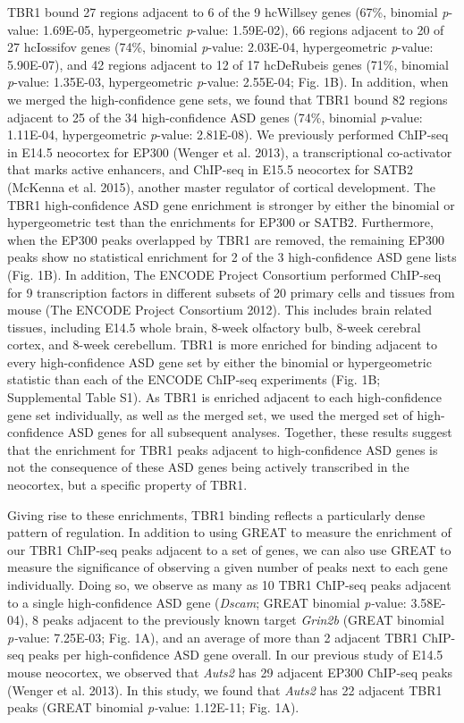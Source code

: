 \documentclass[]{article}
\begin{document}
TBR1 bound 27 regions adjacent to 6 of the 9 hcWillsey genes (67\%,
binomial \emph{p}-value: 1.69E-05, hypergeometric \emph{p}-value:
1.59E-02), 66 regions adjacent to 20 of 27 hcIossifov genes (74\%,
binomial \emph{p}-value: 2.03E-04, hypergeometric \emph{p}-value:
5.90E-07), and 42 regions adjacent to 12 of 17 hcDeRubeis genes (71\%,
binomial \emph{p}-value: 1.35E-03, hypergeometric \emph{p}-value:
2.55E-04; Fig. 1B). In addition, when we merged the high-confidence gene
sets, we found that TBR1 bound 82 regions adjacent to 25 of the 34
high-confidence ASD genes (74\%, binomial \emph{p}-value: 1.11E-04,
hypergeometric \emph{p}-value: 2.81E-08). We previously performed
ChIP-seq in E14.5 neocortex for EP300 (Wenger et al. 2013), a
transcriptional co-activator that marks active enhancers, and ChIP-seq
in E15.5 neocortex for SATB2 (McKenna et al. 2015), another master
regulator of cortical development. The TBR1 high-confidence ASD gene
enrichment is stronger by either the binomial or hypergeometric test
than the enrichments for EP300 or SATB2. Furthermore, when the EP300
peaks overlapped by TBR1 are removed, the remaining EP300 peaks show no
statistical enrichment for 2 of the 3 high-confidence ASD gene lists
(Fig. 1B). In addition, The ENCODE Project Consortium performed ChIP-seq
for 9 transcription factors in different subsets of 20 primary cells and
tissues from mouse (The ENCODE Project Consortium 2012). This includes
brain related tissues, including E14.5 whole brain, 8-week olfactory
bulb, 8-week cerebral cortex, and 8-week cerebellum. TBR1 is more
enriched for binding adjacent to every high-confidence ASD gene set by
either the binomial or hypergeometric statistic than each of the ENCODE
ChIP-seq experiments (Fig. 1B; Supplemental Table S1). As TBR1 is
enriched adjacent to each high-confidence gene set individually, as well
as the merged set, we used the merged set of high-confidence ASD genes
for all subsequent analyses. Together, these results suggest that the
enrichment for TBR1 peaks adjacent to high-confidence ASD genes is not
the consequence of these ASD genes being actively transcribed in the
neocortex, but a specific property of TBR1.

Giving rise to these enrichments, TBR1 binding reflects a particularly
dense pattern of regulation. In addition to using GREAT to measure the
enrichment of our TBR1 ChIP-seq peaks adjacent to a set of genes, we can
also use GREAT to measure the significance of observing a given number
of peaks next to each gene individually. Doing so, we observe as many as
10 TBR1 ChIP-seq peaks adjacent to a single high-confidence ASD gene
(\emph{Dscam}; GREAT binomial \emph{p­-}value: 3.58E-04), 8 peaks
adjacent to the previously known target \emph{Grin2b} (GREAT binomial
\emph{p-}value: 7.25E-03; Fig. 1A), and an average of more than 2
adjacent TBR1 ChIP-seq peaks per high-confidence ASD gene overall. In
our previous study of E14.5 mouse neocortex, we observed that
\emph{Auts2} has 29 adjacent EP300 ChIP-seq peaks (Wenger et al. 2013).
In this study, we found that \emph{Auts2} has 22 adjacent TBR1 peaks
(GREAT binomial \emph{p-}value: 1.12E-11; Fig. 1A).
\end{document}
